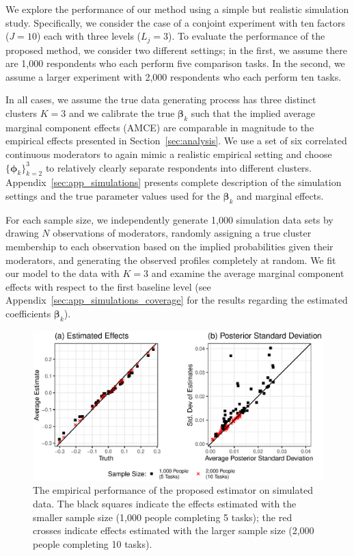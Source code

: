 \documentclass[11pt]{article}
\newcommand\spacingset[1]{\renewcommand{\baselinestretch}%
  {#1}\small\normalsize}
\begin{document}
We explore the performance of our method using a simple but realistic
simulation study.  Specifically, we consider the case of a conjoint
experiment with ten factors ($J = 10$) each with three levels
($L_j = 3$). To evaluate the performance of the proposed method, we
consider two different settings; in the first, we assume there are
1,000 respondents who each perform five comparison tasks. In the
second, we assume a larger experiment with 2,000 respondents who each
perform ten tasks.

In all cases, we assume the true data generating process has three
distinct clusters $K = 3$ and we calibrate the true $\bm{\beta}_k$
such that the implied average marginal component effects (AMCE) are comparable in
magnitude to the empirical effects presented in
Section~\ref{sec:analysis}. We use a set of six correlated continuous
moderators to again mimic a realistic empirical setting and choose
$\{\bm{\phi}_k\}_{k=2}^3$ to relatively clearly separate respondents into different clusters.  Appendix~\ref{sec:app_simulations} presents complete
description of the simulation settings and the true parameter values
used for the $\bm{\beta}_k$ and marginal effects.

For each sample size, we independently generate 1,000 simulation data
sets by drawing $N$ observations of moderators, randomly assigning a
true cluster membership to each observation based on the implied
probabilities given their moderators, and generating the observed
profiles completely at random. We fit our model to the data with
$K = 3$ and examine the average marginal component effects with respect to the
first baseline level (see Appendix~\ref{sec:app_simulations_coverage}
for the results regarding the estimated coefficients $\bm{\beta}_k$).

\begin{figure}[!t]
  \centering \spacingset{1}
  \includegraphics[width=\textwidth]{figures/sim_ame.eps}
  \caption{The empirical performance of the proposed estimator on
    simulated data. The black squares indicate the effects estimated
    with the smaller sample size (1,000 people completing 5 tasks);
    the red crosses indicate effects estimated with the larger sample
    size (2,000 people completing 10 tasks).}
  \label{fig:simulation}
\end{figure}
\end{document}
